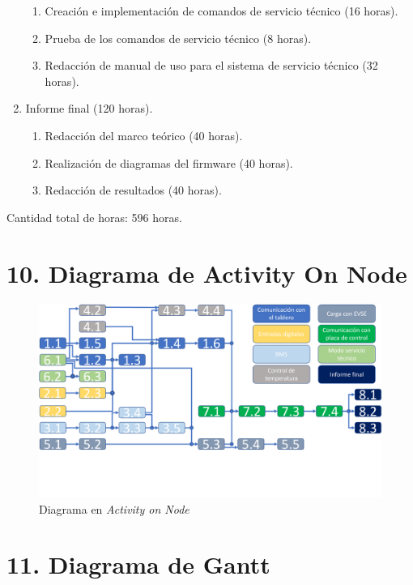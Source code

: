 \documentclass[
11pt, %
codirector, %
]{charter}
\begin{document}
\begin{enumerate}
\begin{enumerate}
		      \item Creación e implementación de comandos de servicio técnico (16 horas).
		      \item Prueba de los comandos de servicio técnico (8 horas).
		      \item Redacción de manual de uso para el sistema de servicio técnico (32 horas).
	      \end{enumerate}
	\item Informe final (120 horas).
	      \begin{enumerate}
		      \item Redacción del marco teórico (40 horas).
		      \item Realización de diagramas del firmware (40 horas).
		      \item Redacción de resultados (40 horas).
	      \end{enumerate}
\end{enumerate}


Cantidad total de horas: 596 horas.




\section{10. Diagrama de Activity On Node}
\label{sec:AoN}

\begin{figure}[htpb]
	\centering
	\includegraphics[width=.8\textwidth]{./Figuras/AoN.pdf}
	\caption{Diagrama en \textit{Activity on Node}}
	\label{fig:AoN}
\end{figure}

\section{11. Diagrama de Gantt}
\label{sec:gantt}
\end{document}
